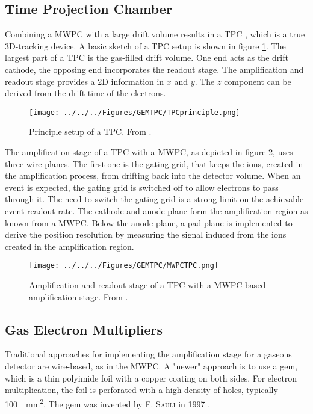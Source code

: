 \subsection{Time Projection Chamber}
Combining a \ac{MWPC} with a large drift volume results in a \ac{TPC} \cite{TPC}, which is a true 3D-tracking device. A basic sketch of a \ac{TPC} setup is shown in figure \ref{fig:theory:tpc}. The largest part of a \ac{TPC} is the gas-filled drift volume. One end acts as the drift cathode, the opposing end incorporates the readout stage. The amplification and readout stage provides a 2D information in $x$ and $y$. The $z$ component can be derived from the drift time of the electrons.
\begin{figure}
	\centering
	\texttt{[image: ../../../Figures/GEMTPC/TPCprinciple.png]}
	\caption{Principle setup of a \ac{TPC}. From \cite{detectorslecture}.}
	\label{fig:theory:tpc}
\end{figure}
The amplification stage of a \ac{TPC} with a \ac{MWPC}, as depicted in figure \ref{fig:theory:tpcreadout}, uses three wire planes. The first one is the gating grid, that keeps the ions, created in the amplification process, from drifting back into the detector volume. When an event is expected, the gating grid is switched off to allow electrons to pass through it. The need to switch the gating grid is a strong limit on the achievable event readout rate.
The cathode and anode plane form the amplification region as known from a \ac{MWPC}. Below the anode plane, a pad plane is implemented to derive the position resolution by measuring the signal induced from the ions created in the amplification region. 
\begin{figure}
	\centering
	\texttt{[image: ../../../Figures/GEMTPC/MWPCTPC.png]}
	\caption{Amplification and readout stage of a \ac{TPC} with a \ac{MWPC} based amplification stage. From \cite{detectorslecture}.}
	\label{fig:theory:tpcreadout}
\end{figure}

\subsection{Gas Electron Multipliers}
Traditional approaches for implementing the amplification stage for a gaseous detector are wire-based, as in the \ac{MWPC}. A "newer" approach is to use a \ac{gem}, which is a thin polyimide foil with a copper coating on both sides. For electron multiplication, the foil is perforated with a high density of holes, typically \SI{100}{\per\mm^2}. The \ac{gem} was invented by \textsc{F. Sauli} in 1997 \cite{sauligem}. 

